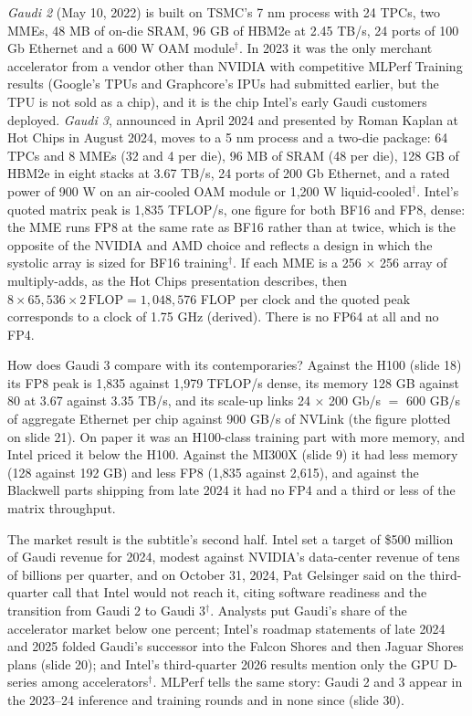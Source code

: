 \documentclass[11pt,letterpaper]{article}
\begin{document}
\emph{Gaudi 2} (May 10, 2022) is built on TSMC's 7 nm process with 24 TPCs, two MMEs, 48 MB of on-die SRAM, 96 GB of HBM2e at 2.45 TB/s, 24 ports of 100 Gb Ethernet and a 600 W OAM module$^\dagger$. In 2023 it was the only merchant accelerator from a vendor other than NVIDIA with competitive MLPerf Training results (Google's TPUs and Graphcore's IPUs had submitted earlier, but the TPU is not sold as a chip), and it is the chip Intel's early Gaudi customers deployed. \emph{Gaudi 3}, announced in April 2024 and presented by Roman Kaplan at Hot Chips in August 2024, moves to a 5 nm process and a two-die package: 64 TPCs and 8 MMEs (32 and 4 per die), 96 MB of SRAM (48 per die), 128 GB of HBM2e in eight stacks at 3.67 TB/s, 24 ports of 200 Gb Ethernet, and a rated power of 900 W on an air-cooled OAM module or 1{,}200 W liquid-cooled$^\dagger$. Intel's quoted matrix peak is 1{,}835 TFLOP/s, one figure for both BF16 and FP8, dense: the MME runs FP8 at the same rate as BF16 rather than at twice, which is the opposite of the NVIDIA and AMD choice and reflects a design in which the systolic array is sized for BF16 training$^\dagger$. If each MME is a 256 $\times$ 256 array of multiply-adds, as the Hot Chips presentation describes, then $8 \times 65{,}536 \times 2\,\text{FLOP} = 1{,}048{,}576$ FLOP per clock and the quoted peak corresponds to a clock of 1.75 GHz (derived). There is no FP64 at all and no FP4.

How does Gaudi 3 compare with its contemporaries? Against the H100 (slide 18) its FP8 peak is 1{,}835 against 1{,}979 TFLOP/s dense, its memory 128 GB against 80 at 3.67 against 3.35 TB/s, and its scale-up links 24 $\times$ 200 Gb/s $=$ 600 GB/s of aggregate Ethernet per chip against 900 GB/s of NVLink (the figure plotted on slide 21). On paper it was an H100-class training part with more memory, and Intel priced it below the H100. Against the MI300X (slide 9) it had less memory (128 against 192 GB) and less FP8 (1{,}835 against 2{,}615), and against the Blackwell parts shipping from late 2024 it had no FP4 and a third or less of the matrix throughput.

The market result is the subtitle's second half. Intel set a target of \$500 million of Gaudi revenue for 2024, modest against NVIDIA's data-center revenue of tens of billions per quarter, and on October 31, 2024, Pat Gelsinger said on the third-quarter call that Intel would not reach it, citing software readiness and the transition from Gaudi 2 to Gaudi 3$^\dagger$. Analysts put Gaudi's share of the accelerator market below one percent; Intel's roadmap statements of late 2024 and 2025 folded Gaudi's successor into the Falcon Shores and then Jaguar Shores plans (slide 20); and Intel's third-quarter 2026 results mention only the GPU D-series among accelerators$^\dagger$. MLPerf tells the same story: Gaudi 2 and 3 appear in the 2023--24 inference and training rounds and in none since (slide 30).
\end{document}
